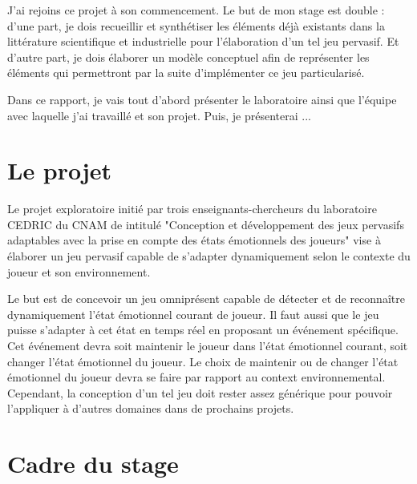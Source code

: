 \documentclass{article}
\begin{document}
	J'ai rejoins ce projet à son commencement. 
	Le but de mon stage est double : 
	d'une part, je dois recueillir et synthétiser les éléments déjà existants dans la littérature scientifique et industrielle pour l'élaboration d'un tel jeu pervasif. 
	Et d'autre part, je dois élaborer un modèle conceptuel afin de représenter les éléments qui permettront par la suite d'implémenter ce jeu particularisé.\par
	Dans ce rapport, je vais tout d'abord présenter le laboratoire ainsi que l'équipe avec laquelle j'ai travaillé et son projet. Puis, je présenterai ...

\section{Le projet}
	Le projet exploratoire initié par trois enseignants-chercheurs du laboratoire CEDRIC du CNAM de intitulé "Conception et développement des jeux pervasifs adaptables avec la prise en compte des états émotionnels des joueurs" vise à élaborer un jeu pervasif capable de s'adapter dynamiquement selon le contexte du joueur et son environnement.\par
	Le but est de concevoir un jeu omniprésent capable de détecter et de reconnaître dynamiquement l'état émotionnel courant de joueur. 
	Il faut aussi que le jeu puisse s'adapter à cet état en temps réel en proposant un événement spécifique. 
	Cet événement devra soit maintenir le joueur dans l'état émotionnel courant, soit changer l'état émotionnel du joueur. 
	Le choix de maintenir ou de changer l'état émotionnel du joueur devra se faire par rapport au context environnemental.
	Cependant, la conception d'un tel jeu doit rester assez générique pour pouvoir l'appliquer à d'autres domaines dans de prochains projets.\par 



\section{Cadre du stage}
\end{document}
